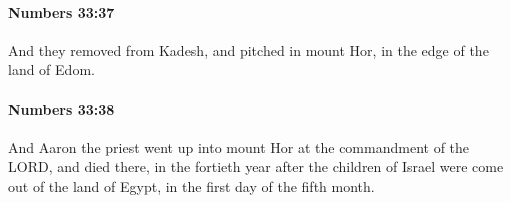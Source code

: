 		\paragraph{Numbers 33:37} %
			\label{NUMBERS-33-37}

			And they removed from Kadesh, and pitched in mount Hor, in the edge of the land of Edom.


		\paragraph{Numbers 33:38} %
			\label{NUMBERS-33-38}

			And Aaron the priest went up into mount Hor at the commandment of the LORD, and died there, in the fortieth year after the children of Israel were come out of the land of Egypt, in the first day of the fifth month.


